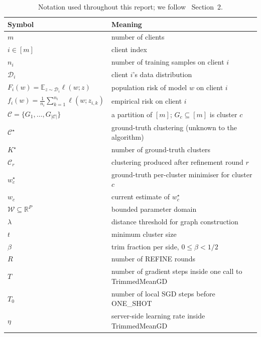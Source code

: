 \begin{table}[h]
\centering
\small
\begin{tabular}{ll}
\toprule
Symbol & Meaning \\
\midrule
$m$                  & number of clients \\
$i \in [m]$          & client index \\
$n_i$                & number of training samples on client $i$ \\
$\mathcal{D}_i$      & client $i$'s data distribution \\
$F_i(w) = \mathbb{E}_{z\sim\mathcal{D}_i} \ell(w; z)$ & population risk of model $w$ on client $i$ \\
$f_i(w) = \tfrac{1}{n_i}\sum_{k=1}^{n_i} \ell(w; z_{i,k})$ & empirical risk on client $i$ \\
$\mathcal{C} = \{G_1,\dots,G_{|\mathcal{C}|}\}$ & a partition of $[m]$; $G_c \subseteq [m]$ is cluster $c$ \\
$\mathcal{C}^\star$  & ground-truth clustering (unknown to the algorithm) \\
$K^\star$            & number of ground-truth clusters \\
$\mathcal{C}_r$      & clustering produced after refinement round $r$ \\
$w_c^\star$          & ground-truth per-cluster minimiser for cluster $c$ \\
$w_c$                & current estimate of $w_c^\star$ \\
$\mathcal{W} \subseteq \mathbb{R}^P$ & bounded parameter domain \\
$\lambda$            & distance threshold for graph construction \\
$t$                  & minimum cluster size \\
$\beta$              & trim fraction per side, $0 \le \beta < 1/2$ \\
$R$                  & number of REFINE rounds \\
$T$                  & number of gradient steps inside one call to TrimmedMeanGD \\
$T_0$                & number of local SGD steps before ONE\_SHOT \\
$\eta$               & server-side learning rate inside TrimmedMeanGD \\
\bottomrule
\end{tabular}
\caption{Notation used throughout this report; we follow~\parencite{vardhan2024srfca} Section~2.}\label{tab:notation}
\end{table}

